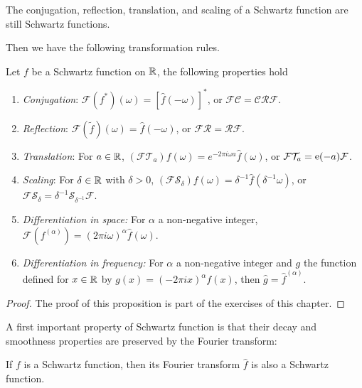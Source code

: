 \begin{proposition}
  The conjugation, reflection, translation, and scaling of a Schwartz function are still
  Schwartz functions.
\end{proposition}
Then we have the following transformation rules.
\begin{proposition}
  \label{prop:ft-trans}
  Let $f$ be a Schwartz function on $\mathbb{R}$, the following properties hold
  \begin{enumerate}
    \item \emph{Conjugation}: $\mathcal{F}(f^*)(\omega)=[\hat{f}(-\omega)]^*$, or
      $\mathcal{F}\mathcal{C}=\mathcal{C}\mathcal{R}\mathcal{F}$.
    \item \emph{Reflection}: $\mathcal{F}(\tilde{f})(\omega)=\hat{f}(-\omega)$, or
      $\mathcal{F}\mathcal{R}=\mathcal{R}\mathcal{F}$.
    \item \emph{Translation}: For $a\in\mathbb{R}$, $(\mathcal{F}\mathcal{T}_{a})f(\omega)
      =e^{-2\pi i\omega a}\hat{f}(\omega)$, or
      $\mathcal{F}\mathcal{T}_{a}=\operatorname{e}(-a)\mathcal{F}$.
    \item \emph{Scaling}: For $\delta\in\mathbb{R}$ with $\delta>0$,
      $(\mathcal{F}\mathcal{S}_{\delta})f(\omega)=\delta^{-1}\hat{f}(\delta^{-1}\omega)$,
      or
      $\mathcal{F}\mathcal{S}_{\delta}=\delta^{-1}\mathcal{S}_{\delta^{-1}}\mathcal{F}$.
    \item \emph{Differentiation in space:} For $\alpha$ a non-negative integer,
      $\mathcal{F}(f^{(\alpha )})=(2\pi i\omega)^{\alpha}\hat{f}(\omega)$.
    \item \emph{Differentiation in frequency:} For $\alpha$ a non-negative integer and $g$
      the function defined for $x\in\mathbb{R}$ by $g(x)=(-2\pi ix)^\alpha f(x)$, then
      $\hat{g}=\hat{f}^{(\alpha)}$.
  \end{enumerate}
\end{proposition}
\begin{proof}
  The proof of this proposition is part of the exercises of this chapter.
\end{proof}
A first important property of Schwartz function is that their decay and smoothness
properties are preserved by the Fourier transform:
\begin{theorem}
  If $f$ is a Schwartz function, then its Fourier transform $\hat{f}$ is also a Schwartz
  function.
\end{theorem}
